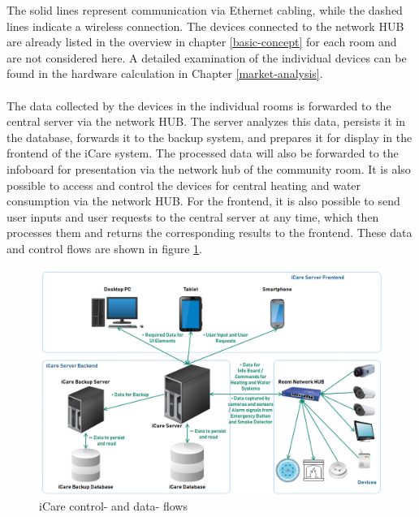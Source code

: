 The solid lines represent communication via Ethernet cabling, while the dashed lines indicate a wireless connection. The devices connected to the network HUB are already listed in the overview in chapter \ref{basic-concept} for each room and are not considered here. A detailed examination of the individual devices can be found in the hardware calculation in Chapter \ref{market-analysis}.
\\\\
The data collected by the devices in the individual rooms is forwarded to the central server via the network HUB. The server analyzes this data, persists it in the database, forwards it to the backup system, and prepares it for display in the frontend of the iCare system. The processed data will also be forwarded to the infoboard for presentation via the network hub of the community room. It is also possible to access and control the devices for central heating and water consumption via the network HUB. For the frontend, it is also possible to send user inputs and user requests to the central server at any time, which then processes them and returns the corresponding results to the frontend. These data and control flows are shown in figure \ref{icare-dataflow}.
\begin{figure}[H]
	\centering
	\includegraphics[width =1.0\textwidth]{images/iCare-Dataflow.PNG}
	\caption{iCare control- and data- flows}
	\label{icare-dataflow}
\end{figure}